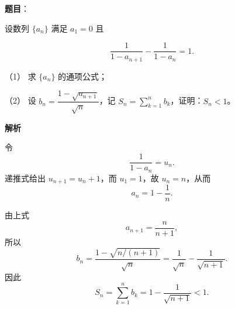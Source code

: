 \begin{answer}

\textbf{题目}：

设数列 $\{a_n\}$ 满足 $a_1=0$ 且

\nopagebreak[4]
\[
\frac{1}{1-a_{n+1}}-\frac{1}{1-a_n}=1.
\]

（1） 求 $\{a_n\}$ 的通项公式；

（2） 设 $b_n=\dfrac{1-\sqrt{a_{n+1}}}{\sqrt n}$，记 $S_n=\displaystyle\sum_{k=1}^n b_k$，证明：$S_n<1$。

\textbf{解析}


令
\nopagebreak[4]
\[
\frac1{1-a_n}=u_n.
\]
递推式给出 $u_{n+1}=u_n+1$，而 $u_1=1$，故
$u_n=n$，从而
\nopagebreak[4]
\[
a_n=1-\frac1n.
\]


由上式
\nopagebreak[4]
\[
a_{n+1}=\frac n{n+1},
\]
所以
\nopagebreak[4]
\[
b_n=\frac{1-\sqrt{n/(n+1)}}{\sqrt n}
=\frac1{\sqrt n}-\frac1{\sqrt{n+1}}.
\]
因此
\nopagebreak[4]
\[
S_n=\sum_{k=1}^n b_k
=1-\frac1{\sqrt{n+1}}<1.
\]



\end{answer}
